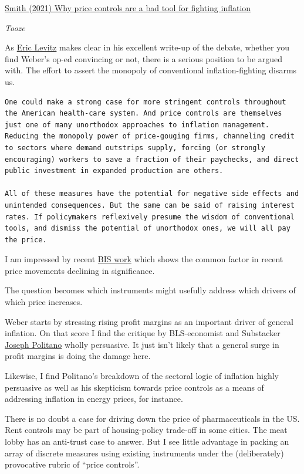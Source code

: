 \documentclass[
]{book}
\begin{document}
\href{https://noahpinion.substack.com/p/why-price-controls-are-a-bad-tool}{Smith (2021) Why price controls are a bad tool for fighting inflation}

\emph{Tooze}

As \href{https://nymag.com/intelligencer/2022/01/to-combat-inflation-the-u-s-should-impose-price-controls.html}{Eric Levitz} makes clear in his excellent write-up of the debate, whether you find Weber's op-ed convincing or not, there is a serious position to be argued with. The effort to assert the monopoly of conventional inflation-fighting disarms us.

\begin{verbatim}
One could make a strong case for more stringent controls throughout the American health-care system. And price controls are themselves just one of many unorthodox approaches to inflation management. Reducing the monopoly power of price-gouging firms, channeling credit to sectors where demand outstrips supply, forcing (or strongly encouraging) workers to save a fraction of their paychecks, and direct public investment in expanded production are others.

All of these measures have the potential for negative side effects and unintended consequences. But the same can be said of raising interest rates. If policymakers reflexively presume the wisdom of conventional tools, and dismiss the potential of unorthodox ones, we will all pay the price.
\end{verbatim}

I am impressed by recent \href{https://www.bis.org/publ/qtrpdf/r_qt2109b.htm}{BIS work} which shows the common factor in recent price movements declining in significance.

The question becomes which instruments might usefully address which drivers of which price increases.

Weber starts by stressing rising profit margins as an important driver of general inflation. On that score I find the critique by BLS-economist and Substacker \href{https://apricitas.substack.com/p/are-rising-corporate-profit-margins}{Joseph Politano} wholly persuasive. It just isn't likely that a general surge in profit margins is doing the damage here.

Likewise, I find Politano's breakdown of the sectoral logic of inflation highly persuasive as well as his skepticism towards price controls as a means of addressing inflation in energy prices, for instance.

There is no doubt a case for driving down the price of pharmaceuticals in the US. Rent controls may be part of housing-policy trade-off in some cities. The meat lobby has an anti-trust case to answer. But I see little advantage in packing an array of discrete measures using existing instruments under the (deliberately) provocative rubric of ``price controls''.
\end{document}
